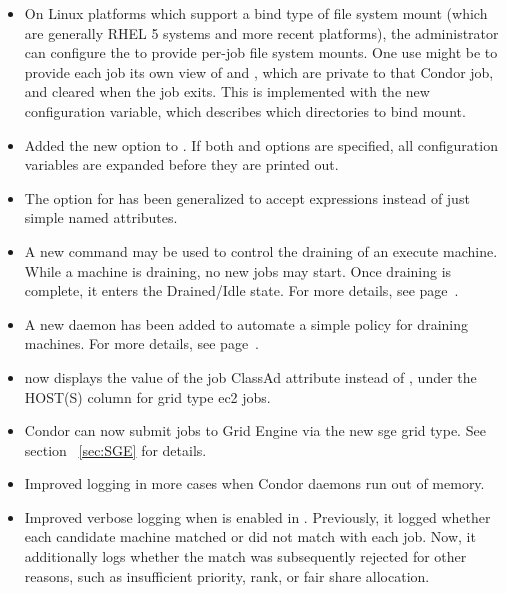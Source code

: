 \begin{itemize}
\item On Linux platforms which support a bind type of file system mount 
(which are generally RHEL 5 systems and more recent platforms), 
the administrator can configure the  
to provide per-job file system mounts.  
One use might be to provide each job its own view of  
and , which are private to that Condor job,
and cleared when the job exits.  
This is implemented with the new  
configuration variable, which describes which directories to bind mount.

\item Added the new  option to .
If both  and  options are specified,
all configuration variables are expanded before they are printed out.

\item The  option for  has been generalized to
accept expressions instead of just simple named attributes.

\item A new command  may be used to control the draining
of an execute machine.  While a machine is draining, no new jobs may
start.  Once draining is complete, it enters the Drained/Idle state.
For more details, see page~\pageref{man-condor-drain}.

\item A new daemon  has been added to automate a simple
policy for draining machines.  For more details, see
page~\pageref{sec:Config-defrag}.

\item  {}  now displays the value of the job ClassAd
attribute  instead of
\Expr{[????????????????]},
under the HOST(S) column for grid type ec2 jobs.

\item Condor can now submit jobs to Grid Engine via the new sge grid type.
See section ~\ref{sec:SGE} for details.

\item Improved logging in more cases when Condor daemons run out of memory.

\item Improved verbose logging when  is enabled in
.  Previously, it logged whether each
candidate machine matched or did not match with each job.  Now, it
additionally logs whether the match was subsequently rejected for
other reasons, such as insufficient priority, rank, or fair share
allocation.


\end{itemize}
